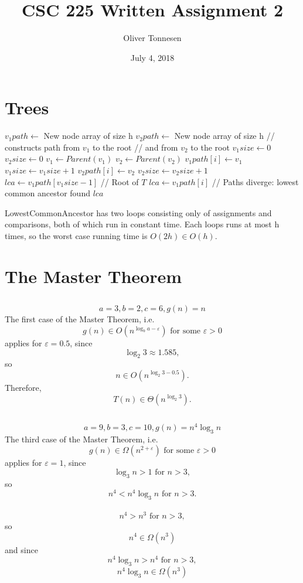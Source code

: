 \documentclass{article}
\title{\vspace{-3.5cm}CSC 225 Written Assignment 2}
\author{Oliver Tonnesen}
\affil{V00885732}
\date{July 4, 2018}
\begin{document}
\maketitle
\renewcommand{\thesubsection}{\thesection.\alph{subsection}}
\section{Trees}
	\begin{algorithmic}[1]
			\State{} $v_1path\gets{}$ New node array of size h
			\State{} $v_2path\gets{}$ New node array of size h
			\State{} // constructs path from $v_1$ to the root
			\State{} // and from $v_2$ to the root
			\State{} $v_1size\gets{}0$
			\State{} $v_2size\gets{}0$
				\State{} $v_1\gets{}Parent(v_1)$
				\State{} $v_2\gets{}Parent(v_2)$
					\State{} $v_1path[i]\gets{}v_1$
					\State{} $v_1size\gets{}v_1size+1$
				\EndIf{}
					\State{}$v_2path[i]\gets{}v_2$
					\State{} $v_2size\gets{}v_2size+1$
				\EndIf{}
			\EndFor{}
			\State{} $lca\gets{}v_1path[v_1size-1]$ // Root of $T$
					\State{} $lca\gets{}v_1path[i]$
				\Else{} // Paths diverge: lowest common ancestor found
					\State{} \Return{} $lca$
				\EndIf{}
			\EndFor{}
		\EndFunction{}
	\end{algorithmic}

	LowestCommonAncestor has two loops consisting only of assignments and comparisons, both of which run in constant time. Each loops runs at most h times, so the worst case running time is $O(2h)\in{}O(h)$.
\newpage
\section{The Master Theorem}
\subsection{}
	\[a=3, b=2, c=6, g(n)=n\]
	The first case of the Master Theorem, i.e.
	\[g(n)\in{}O(n^{\log_b{a}-\varepsilon})\textrm{ for some }\varepsilon>0\]
	applies for $\varepsilon=0.5$, since
	\[\log_2{3}\approx{}1.585,\]
	so
	\[n\in{}O(n^{\log_2{3}-0.5}).\]
	Therefore,
	\[T(n)\in{}\Theta(n^{\log_2{3}}).\]
\subsection{}
	\[a=9, b=3, c=10, g(n)=n^4\log_3{n}\]
	The third case of the Master Theorem, i.e.
	\[g(n)\in{}\Omega(n^{2+\varepsilon})\textrm{ for some }\varepsilon>0\]
	applies for $\varepsilon=1$, since
	\[\log_3{n}>1\text{ for }n>3,\]
	so
	\[n^4<n^4\log_3{n}\text{ for }n>3.\]
	\\
	\[n^4>n^3\text{ for }n>3,\]
	so
	\[n^4\in\Omega(n^3)\]
	and since
	\[n^4\log_3{n}>n^4\text{ for }n>3,\]
	\[n^4\log_3{n}\in\Omega(n^3)\]
	
\end{document}
